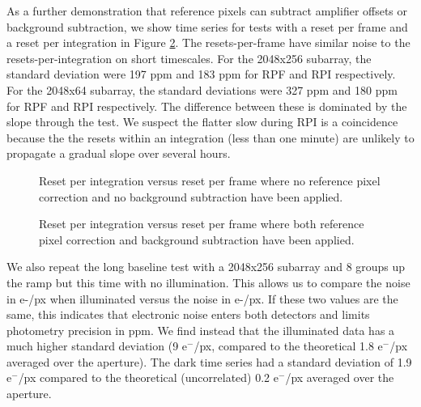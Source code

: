 \documentclass{aastex62}
\begin{document}
As a further demonstration that reference pixels can subtract amplifier offsets or background subtraction, we show time series for tests with a reset per frame and a reset per integration in Figure \ref{fig:RPFvsRPItseries}.
The resets-per-frame have similar noise to the resets-per-integration on short timescales.
For the 2048x256 subarray, the standard deviation were 197 ppm and 183 ppm for RPF and RPI respectively.
For the 2048x64 subarray, the standard deviations were 327 ppm and 180 ppm for RPF and RPI respectively.
The difference between these is dominated by the slope through the test.
We suspect the flatter slow during RPI is a coincidence because the the resets within an integration (less than one minute) are unlikely to propagate a gradual slope over several hours.


\begin{figure}
{}
{}
\caption{Reset per integration versus reset per frame where no reference pixel correction and no background subtraction have been applied.}\label{fig:RPFvsRPItseries}
\end{figure}

\begin{figure}
{}
{}
\caption{Reset per integration versus reset per frame where both reference pixel correction and background subtraction have been applied.}\label{fig:RPFvsRPItseries}
\end{figure}

We also repeat the long baseline test with a 2048x256 subarray and 8 groups up the ramp but this time with no illumination.
This allows us to compare the noise in e-/px when illuminated versus the noise in e-/px.
If these two values are the same, this indicates that electronic noise enters both detectors and limits photometry precision in ppm.
We find instead that the illuminated data has a much higher standard deviation (9 e$^-$/px, compared to the theoretical 1.8 e$^-$/px averaged over the aperture).
The dark time series had a standard deviation of 1.9 e$^-$/px compared to the theoretical (uncorrelated) 0.2 e$^-$/px averaged over the aperture.
\end{document}
